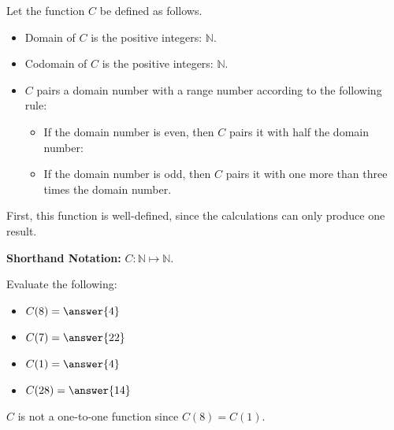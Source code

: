 \documentclass{ximera}
\begin{document}
\begin{example} 

Let the function $C$ be defined as follows.


\begin{itemize}
\item Domain of $C$ is the positive integers: $\mathbb{N}$.
\item Codomain of $C$ is the positive integers: $\mathbb{N}$.
\item $C$ pairs a domain number with a range number according to the following rule:
	\begin{itemize}
			\item If the domain number is even, then $C$ pairs it with half the domain number:
			\item If the domain number is odd, then $C$ pairs it with one more than three times the domain number.
	\end{itemize}
\end{itemize}


First, this function is well-defined, since the calculations can only produce one result.


\textbf{Shorthand Notation: } $C: \mathbb{N} \mapsto \mathbb{N}$.

\begin{question} 


Evaluate the following:

\begin{itemize}
	\item $C(8) = \answer{4}$
	\item $C(7) = \answer{22}$
	\item $C(1) = \answer{4}$
	\item $C(28) = \answer{14}$
\end{itemize}

\end{question}



$C$ is not a one-to-one function since $C(8) = C(1)$.


\end{example}
\end{document}
